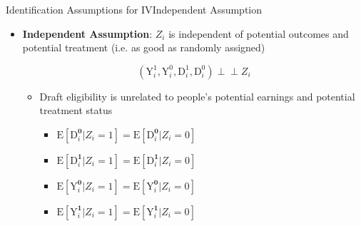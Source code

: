 \documentclass[dvipsnames,hyperref={pdfpagelabels=false}]{beamer}
\newcommand{\indep}{\perp\!\!\!\perp}
\begin{document}
\begin{frame}{Identification Assumptions for IV}{Independent Assumption}
	\begin{itemize}
	
		\item \textbf{Independent Assumption}: $Z_{i}$ is independent of potential  outcomes and potential treatment (i.e. as good as randomly assigned)
		
		\begin{equation*}
			(\mathrm{Y}^{1}_{i},\mathrm{Y}^{0}_{i}, \mathrm{D}^{1}_{i},\mathrm{D}^{0}_{i})\indep Z_{i}
		\end{equation*}
		\vspace{0.2cm}
				\begin{itemize}
		\item Draft eligibility is unrelated to people's potential earnings and potential treatment status 
		
		\begin{itemize}
			\vspace{0.2cm}
			\item $\mathrm{E}[\mathrm{D}^{\textbf{0}}_{i}|Z_i=1]=\mathrm{E}[\mathrm{D}^{\textbf{0}}_{i}|Z_i=0]$ 
			\vspace{0.2cm}
			\item $\mathrm{E}[\mathrm{D}^{\textbf{1}}_{i}|Z_i=1]=\mathrm{E}[\mathrm{D}^{\textbf{1}}_{i}|Z_i=0]$ 
			
			\vspace{0.2cm}
			\item $\mathrm{E}[\mathrm{Y}^{\textbf{0}}_{i}|Z_i=1]=\mathrm{E}[\mathrm{Y}^{\textbf{0}}_{i}|Z_i=0]$ 
			\vspace{0.2cm}
			\item $\mathrm{E}[\mathrm{Y}^{\textbf{1}}_{i}|Z_i=1]=\mathrm{E}[\mathrm{Y}^{\textbf{1}}_{i}|Z_i=0]$ 
			\vspace{0.2cm}
			
		\end{itemize}
				\end{itemize}
	\end{itemize}
\end{frame}
\end{document}
